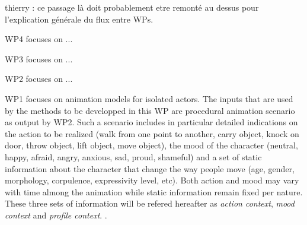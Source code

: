 \begin{xcomment}  
thierry : ce passage là doit probablement etre remonté au dessus pour l'explication générale du flux entre WPs. 
\end{xcomment}


WP4 focuses on ...

WP3 focuses on ...

WP2 focuses on ...


WP1 focuses on animation models for isolated actors.  The inputs that are used by the methods to be developped in this WP are procedural animation scenario as output by WP2.  Such a scenario includes in particular detailed indications on the action to be realized (walk from one point to another, carry object, knock on door, throw object, lift object, move object), the mood of the character (neutral, happy, afraid, angry, anxious, sad, proud, shameful) and a set of static information about the character that change the way people move (age, gender, morphology, corpulence, expressivity level, etc). Both action and mood may vary with time almong the animation while static information remain fixed per nature.  These three sets of information will be refered hereafter as \textit{action context}, \textit{mood context} and \textit{profile context}. . 


\endinput